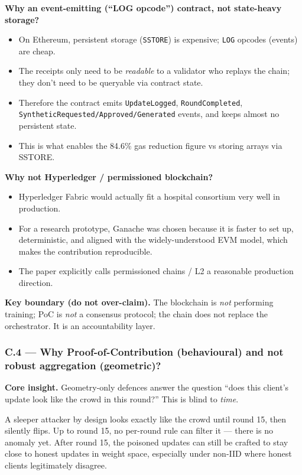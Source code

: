 \documentclass[11pt,a4paper]{article}
\begin{document}
\textbf{Why an event-emitting (``LOG opcode'') contract, not state-heavy storage?}
\begin{itemize}
\item On Ethereum, persistent storage (\texttt{SSTORE}) is expensive; \texttt{LOG} opcodes (events) are cheap.
\item The receipts only need to be \emph{readable} to a validator who replays the chain; they don't need to be queryable via contract state.
\item Therefore the contract emits \texttt{UpdateLogged}, \texttt{RoundCompleted}, \texttt{SyntheticRequested/Approved/Generated} events, and keeps almost no persistent state.
\item This is what enables the 84.6\% gas reduction figure vs storing arrays via SSTORE.
\end{itemize}

\textbf{Why not Hyperledger / permissioned blockchain?}
\begin{itemize}
\item Hyperledger Fabric would actually fit a hospital consortium very well in production.
\item For a research prototype, Ganache was chosen because it is faster to set up, deterministic, and aligned with the widely-understood EVM model, which makes the contribution reproducible.
\item The paper explicitly calls permissioned chains / L2 a reasonable production direction.
\end{itemize}

\textbf{Key boundary (do not over-claim).}
The blockchain is \emph{not} performing training; PoC is \emph{not} a
consensus protocol; the chain does not replace the orchestrator. It is
an accountability layer.

\subsubsection{C.4 --- Why Proof-of-Contribution (behavioural) and not robust aggregation (geometric)?}

\textbf{Core insight.} Geometry-only defences answer the question
``does this client's update look like the crowd in this round?''
This is blind to \emph{time}.

A sleeper attacker by design looks exactly like the crowd until round
15, then silently flips. Up to round 15, no per-round rule can filter
it --- there is no anomaly yet. After round 15, the poisoned updates
can still be crafted to stay close to honest updates in weight space,
especially under non-IID where honest clients legitimately disagree.
\end{document}
